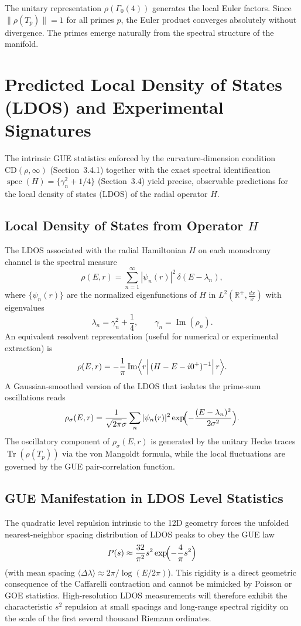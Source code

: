 \documentclass[11pt,a4paper]{article}
\begin{document}
The unitary representation \(\rho(\Gamma_0(4))\) generates the local Euler factors. Since \(\|\rho(T_p)\| = 1\) for all primes \(p\), the Euler product converges absolutely without divergence. The primes emerge naturally from the spectral structure of the manifold.

\section{Predicted Local Density of States (LDOS) and Experimental Signatures}

The intrinsic GUE statistics enforced by the curvature-dimension condition \(\mathrm{CD}(\rho,\infty)\) (Section~3.4.1) together with the exact spectral identification \(\operatorname{spec}(H) = \{\gamma_n^2 + 1/4\}\) (Section~3.4) yield precise, observable predictions for the local density of states (LDOS) of the radial operator \(H\).

\subsection{Local Density of States from Operator \texorpdfstring{$H$}{H}}

The LDOS associated with the radial Hamiltonian \(H\) on each monodromy channel is the spectral measure
\[
\rho(E,r) = \sum_{n=1}^\infty |\psi_n(r)|^2\,\delta(E - \lambda_n),
\]
where \(\{\psi_n(r)\}\) are the normalized eigenfunctions of \(H\) in \(L^2(\mathbb{R}^+,\frac{dx}{x})\) with eigenvalues
\[
\lambda_n = \gamma_n^2 + \frac{1}{4},\qquad \gamma_n = \operatorname{Im}(\rho_n).
\]
An equivalent resolvent representation (useful for numerical or experimental extraction) is
\[
\rho(E,r) = -\frac{1}{\pi}\operatorname{Im}\Bigl\langle r \Bigl|\,(H - E - i0^+)^{-1}\Bigr|\,r\Bigr\rangle.
\]
A Gaussian-smoothed version of the LDOS that isolates the prime-sum oscillations reads
\[
\rho_\sigma(E,r) = \frac{1}{\sqrt{2\pi}\sigma}\sum_n |\psi_n(r)|^2\exp\!\Bigl(-\frac{(E-\lambda_n)^2}{2\sigma^2}\Bigr).
\]
The oscillatory component of \(\rho_\sigma(E,r)\) is generated by the unitary Hecke traces \(\operatorname{Tr}(\rho(T_p))\) via the von Mangoldt formula, while the local fluctuations are governed by the GUE pair-correlation function.

\subsection{GUE Manifestation in LDOS Level Statistics}

The quadratic level repulsion intrinsic to the 12D geometry forces the unfolded nearest-neighbor spacing distribution of LDOS peaks to obey the GUE law
\[
P(s) \approx \frac{32}{\pi^2}s^2\exp\!\Bigl(-\frac{4}{\pi}s^2\Bigr)
\]
(with mean spacing \(\langle\Delta\lambda\rangle \approx 2\pi/\log(E/2\pi)\)). This rigidity is a direct geometric consequence of the Caffarelli contraction and cannot be mimicked by Poisson or GOE statistics. High-resolution LDOS measurements will therefore exhibit the characteristic \(s^2\) repulsion at small spacings and long-range spectral rigidity on the scale of the first several thousand Riemann ordinates.
\end{document}

